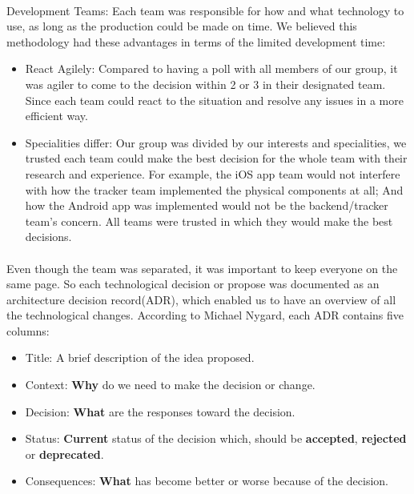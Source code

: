 \documentclass[12pt,a4paper]{article}
\begin{document}
        \paragraph{}Development Teams: Each team was responsible for how and what technology to use, as long as the production could be made on time. We believed this methodology had these advantages in terms of the limited development time:

        \begin{itemize}
          \item {React Agilely}: Compared to having a poll with all members of our group, it was agiler to come to the decision within 2 or 3 in their designated team. Since each team could react to the situation and resolve any issues in a more efficient way.
          \item {Specialities differ}: Our group was divided by our interests and specialities, we trusted each team could make the best decision for the whole team with their research and experience. For example, the iOS app team would not interfere with how the tracker team implemented the physical components at all; And how the Android app was implemented would not be the backend/tracker team's concern. All teams were trusted in which they would make the best decisions.
        \end{itemize}
        
        \paragraph{}Even though the team was separated, it was important to keep everyone on the same page. So each technological decision or propose was documented as an architecture decision record(ADR), which enabled us to have an overview of all the technological changes. According to Michael Nygard, each ADR contains five columns\cite{ArchitectureDecisionRecord}: 

        \begin{itemize}
          \item Title: A brief description of the idea proposed.
          \item Context: {\bf Why} do we need to make the decision or change.                   
          \item Decision: {\bf What} are the responses toward the decision.
          \item Status: {\bf Current} status of the decision which, should be {\bf accepted}, {\bf rejected} or {\bf deprecated}.
          \item Consequences: {\bf What} has become better or worse because of the decision.
        \end{itemize}
\end{document}
